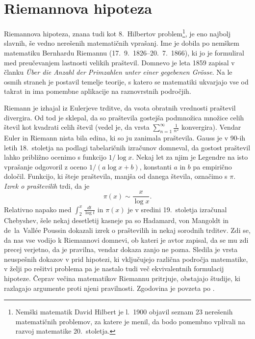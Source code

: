 \documentclass[mat1]{fmfdelo}
\begin{document}
\section{Riemannova hipoteza}

Riemannova hipoteza, znana tudi kot 8.~Hilbertov problem\footnote{Nemški matematik David Hilbert je l.~1900 objavil seznam 23 nerešenih matematičnih problemov, za katere je menil, da bodo pomembno vplivali na razvoj matematike 20.~stoletja.}, je eno najbolj slavnih, še vedno nerešenih matematičnih vprašanj. Ime je dobila po nemškem matematiku Bernhardu Riemannu (17.\ 9.\ 1826--20.\ 7.\ 1866), ki jo je formuliral med preučevanjem lastnosti velikih praštevil. Domnevo je leta 1859 zapisal v članku \emph{\"Uber die Anzahl der Primzahlen unter einer gegebenen Gr\"osse}. Na le osmih straneh je postavil temelje teorije, s katero se matematiki ukvarjajo vse od takrat in ima pomembne aplikacije na raznovrstnih področjih. 

Riemann je izhajal iz Eulerjeve trditve, da vsota obratnih vrednosti praštevil divergira. Od tod je sklepal, da so praštevila gostejša podmnožica množice celih števil kot kvadrati celih števil (vedel je, da vrsta $\sum_{n=1}^{\infty} \frac{1}{n^2}$ konvergira).
Vendar Euler in Riemann nista bila edina, ki so ju zanimala praštevila. Gauss je v 90-ih letih 18.~stoletja na podlagi tabelaričnih izračunov domneval, da gostost praštevil lahko približno ocenimo s funkcijo $1/ \log{x}$. Nekaj let za njim je Legendre na isto vprašanje odgovoril z oceno $1/ (a\log{x}+b)$, konstanti $a$ in $b$ pa empirično določil. 
Funkcijo, ki šteje praštevila, manjša od danega števila, označimo s $\pi$. \emph{Izrek o praštevilih} trdi, da je
\begin{equation}
\pi(x) \sim \frac{x}{\log{x}}.
\end{equation}
%
Relativno napako med $\int_{2}^x \frac{dt}{\log{t}}$ in $\pi(x)$ je v sredini 19.~stoletja izračunal Chebyshev, šele nekaj desetletij kasneje pa so Hadamard, von Mangoldt in de~la~Vall\'ee Poussin dokazali izrek o praštevilih in nekaj sorodnih trditev. Zdi se, da nas vse vodijo k Riemannovi domnevi, ob kateri je avtor zapisal, da se mu zdi precej verjetno, da je pravilna, vendar dokaza zanjo ne pozna. Sledila je vrsta neuspešnih dokazov v prid hipotezi, ki vključujejo različna področja matematike, v želji po rešitvi problema pa je nastalo tudi več ekvivalentnih formulacij hipoteze. Čeprav večina matematikov Riemannu pritrjuje, obstajajo študije, ki razlagajo argumente proti njeni pravilnosti.
Zgodovina je povzeta po \cite[poglavje 1.1]{zetafunction}.
%
\end{document}
